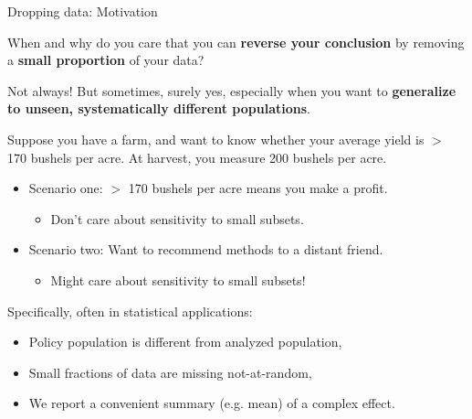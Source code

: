\begin{frame}{Dropping data: Motivation}

When and why do you care that you can \textbf{reverse your conclusion} by
removing a \textbf{small proportion} of your data?

\vspace{1em}
Not always!  But sometimes, surely yes, especially when you want to
\textbf{generalize to unseen, systematically different populations}.

\vspace{1em}
Suppose you have a farm, and want to know whether
your average yield is $>$ 170 bushels per acre.
At harvest, you measure 200 bushels per acre.

\begin{itemize}
    \item Scenario one: $>$ 170 bushels
        per acre means you make a profit.
        \begin{itemize}
            \item Don’t care about sensitivity to small subsets.
        \end{itemize}
    \item Scenario two: Want to recommend methods to a distant friend.
    \begin{itemize}
        \item Might care about sensitivity to small subsets!
    \end{itemize}
\end{itemize}


\vspace{1em}
Specifically, often in statistical applications:
%
\begin{itemize}
\item Policy population is different from analyzed population,
\item Small fractions of data are missing not-at-random,
\item We report a convenient summary (e.g. mean) of a complex effect.
\end{itemize}


\end{frame}
